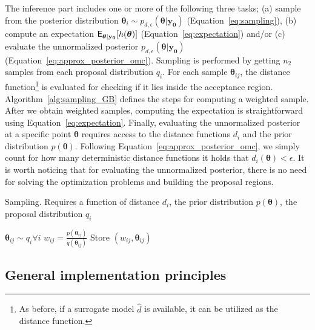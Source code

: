 \documentclass[article]{jss}
\newcommand{\thetab}{\boldsymbol{\theta}}
\newcommand{\data}{\mathbf{y_0}}
\begin{document}
The inference part includes one or more of the following three tasks;
(a) sample from the posterior distribution
\( \thetab_i \sim p_{d, \epsilon}(\thetab|\data)\)
(Equation~\ref{eq:sampling}), (b) compute an expectation
\(\E_{\thetab|\data}[h(\thetab)]\) (Equation~\ref{eq:expectation})
and/or (c) evaluate the unnormalized posterior
\(p_{d, \epsilon}(\thetab|\data)\)
(Equation~\ref{eq:approx_posterior_omc}). Sampling is performed by
getting \(n_2\) samples from each proposal distribution \(q_i\). For
each sample \(\thetab_{ij}\), the distance function\footnote{As
  before, if a surrogate model \(\hat{d}\) is available, it can be
  utilized as the distance function.} is evaluated for checking if it
lies inside the acceptance region. Algorithm~\ref{alg:sampling_GB}
defines the steps for computing a weighted sample. After we obtain
weighted samples, computing the expectation is straightforward using
Equation~\ref{eq:expectation}. Finally, evaluating the unnormalized
posterior at a specific point \(\thetab\) requires access to the
distance functions \(d_i\) and the prior distribution
\(p(\thetab)\). Following Equation~\ref{eq:approx_posterior_omc}, we
simply count for how many deterministic distance functions it holds
that \(d_i(\thetab) < \epsilon\). It is worth noticing that for
evaluating the unnormalized posterior, there is no need for solving
the optimization problems and building the proposal regions.

\begin{algorithm}[H]
    \centering
    \caption{Sampling. Requires a function of distance \(d_i\), the prior distribution \(p(\thetab)\), the proposal distribution \(q_i\)}\label{alg:sampling_GB}
    \begin{algorithmic}[1]
      \State \(\thetab_{ij} \sim q_i \forall i\) 
          \If {\(d_i(\thetab_{ij}) \leq \epsilon\)} 
            \State \(w_{ij} = \frac{p(\thetab_{ij})}{q(\thetab_{ij})}\) 
            \State Store \((w_{ij}, \thetab_{ij})\) 
            \EndIf
            \EndFor
    \EndFor
    \end{algorithmic}
\end{algorithm}


\subsection{General implementation principles}
\label{subsec:general_design}
\end{document}
